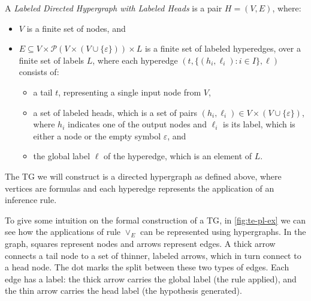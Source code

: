\begin{definition}
\label{def:graph}
A \emph{Labeled Directed Hypergraph with Labeled Heads} is a pair $H = (V, E)$, where:
\begin{itemize}[noitemsep]
  \item \( V \) is a finite set of nodes, and
  \item \( E \subseteq V \times \mathcal{P}(V \times (V \cup \{\varepsilon\})) \times L \) is a finite set of labeled hyperedges, over a finite set of labels $L$, where each hyperedge $(t,\{(h_i,\ell_i): i\in I\}, \ell)$ consists of:
  \begin{itemize}[noitemsep]
    \item a tail $t$, representing a single input node from \( V \),
    \item a set of labeled heads, which is a set of pairs \( (h_i, \ell_i) \in V \times (V \cup \{\varepsilon\}) \), where \( h_i \) indicates one of the output nodes and \( \ell_i \) is its label, which is either a node or the empty symbol \( \varepsilon \), and
    \item the global label $\ell$ of the hyperedge, which is an element of \( L \).
  \end{itemize}
\end{itemize}
\end{definition}

The \gls{TG} we will construct is a directed hypergraph as defined above, where vertices are formulas and each hyperedge represents the application of an inference rule.

To give some intuition on the formal construction of a \gls{TG}, in \autoref{fig:te-pl-ex} we can see  how the applications of rule \(\vee_E\) can be represented using hypergraphs. In the graph, squares represent nodes and arrows represent edges. A thick arrow connects a tail node to a set of thinner, labeled arrows, which in turn connect to a head node. The dot marks the split between these two types of edges. Each edge has a label: the thick arrow carries the global label (the rule applied), and the thin arrow carries the head label (the hypothesis generated).

\vspace{1em}

